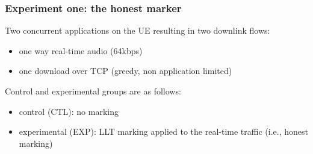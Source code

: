 \begin{frame}
\frametitle{Experiment one: the honest marker}

Two concurrent applications on the UE resulting in two downlink flows:
\begin{itemize}
\item one way real-time audio (64kbps)
\item one download over TCP (greedy, non application limited)
\end{itemize}
\vspace{.5cm}
Control and experimental groups are as follows:
\begin{itemize}
\item control (CTL): no marking
\item experimental (EXP): LLT marking applied to the real-time traffic (i.e., honest marking)
\end{itemize}

\end{frame}
